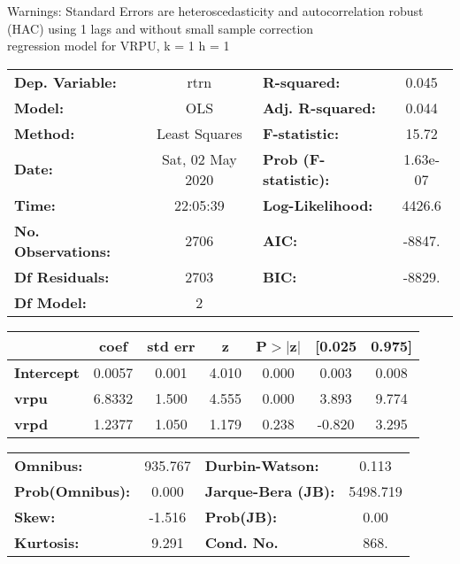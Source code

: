 Warnings: \newline
 [1] Standard Errors are heteroscedasticity and autocorrelation robust (HAC) using 1 lags and without small sample correction\\ 

regression model for VRPU, k = 1 h = 1\begin{center}
\begin{tabular}{lclc}
\toprule
\textbf{Dep. Variable:}    &       rtrn       & \textbf{  R-squared:         } &     0.045   \\
\textbf{Model:}            &       OLS        & \textbf{  Adj. R-squared:    } &     0.044   \\
\textbf{Method:}           &  Least Squares   & \textbf{  F-statistic:       } &     15.72   \\
\textbf{Date:}             & Sat, 02 May 2020 & \textbf{  Prob (F-statistic):} &  1.63e-07   \\
\textbf{Time:}             &     22:05:39     & \textbf{  Log-Likelihood:    } &    4426.6   \\
\textbf{No. Observations:} &        2706      & \textbf{  AIC:               } &    -8847.   \\
\textbf{Df Residuals:}     &        2703      & \textbf{  BIC:               } &    -8829.   \\
\textbf{Df Model:}         &           2      & \textbf{                     } &             \\
\bottomrule
\end{tabular}
\begin{tabular}{lcccccc}
                   & \textbf{coef} & \textbf{std err} & \textbf{z} & \textbf{P$> |$z$|$} & \textbf{[0.025} & \textbf{0.975]}  \\
\midrule
\textbf{Intercept} &       0.0057  &        0.001     &     4.010  &         0.000        &        0.003    &        0.008     \\
\textbf{vrpu}      &       6.8332  &        1.500     &     4.555  &         0.000        &        3.893    &        9.774     \\
\textbf{vrpd}      &       1.2377  &        1.050     &     1.179  &         0.238        &       -0.820    &        3.295     \\
\bottomrule
\end{tabular}
\begin{tabular}{lclc}
\textbf{Omnibus:}       & 935.767 & \textbf{  Durbin-Watson:     } &    0.113  \\
\textbf{Prob(Omnibus):} &   0.000 & \textbf{  Jarque-Bera (JB):  } & 5498.719  \\
\textbf{Skew:}          &  -1.516 & \textbf{  Prob(JB):          } &     0.00  \\
\textbf{Kurtosis:}      &   9.291 & \textbf{  Cond. No.          } &     868.  \\
\bottomrule
\end{tabular}
\end{center}

